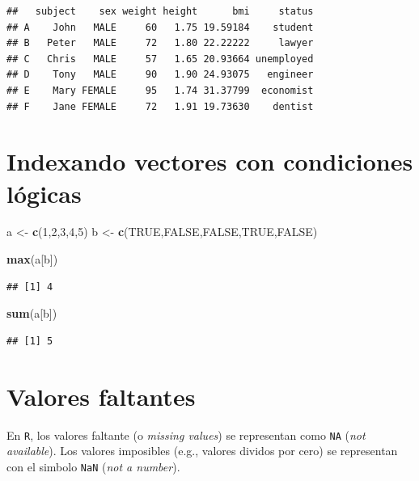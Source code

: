 \documentclass[]{book}
\newenvironment{Shaded}{\begin{snugshade}}{\end{snugshade}}
\newcommand{\KeywordTok}[1]{\textcolor[rgb]{0.13,0.29,0.53}{\textbf{#1}}}
\newcommand{\DecValTok}[1]{\textcolor[rgb]{0.00,0.00,0.81}{#1}}
\newcommand{\StringTok}[1]{\textcolor[rgb]{0.31,0.60,0.02}{#1}}
\newcommand{\OtherTok}[1]{\textcolor[rgb]{0.56,0.35,0.01}{#1}}
\newcommand{\NormalTok}[1]{#1}
\begin{document}
\begin{verbatim}
##   subject    sex weight height      bmi     status
## A    John   MALE     60   1.75 19.59184    student
## B   Peter   MALE     72   1.80 22.22222     lawyer
## C   Chris   MALE     57   1.65 20.93664 unemployed
## D    Tony   MALE     90   1.90 24.93075   engineer
## E    Mary FEMALE     95   1.74 31.37799  economist
## F    Jane FEMALE     72   1.91 19.73630    dentist
\end{verbatim}

\section{Indexando vectores con condiciones
lógicas}\label{indexando-vectores-con-condiciones-luxf3gicas}

\begin{Shaded}
\begin{Highlighting}[]
\NormalTok{a <-}\StringTok{ }\KeywordTok{c}\NormalTok{(}\DecValTok{1}\NormalTok{,}\DecValTok{2}\NormalTok{,}\DecValTok{3}\NormalTok{,}\DecValTok{4}\NormalTok{,}\DecValTok{5}\NormalTok{)}
\NormalTok{b <-}\StringTok{ }\KeywordTok{c}\NormalTok{(}\OtherTok{TRUE}\NormalTok{,}\OtherTok{FALSE}\NormalTok{,}\OtherTok{FALSE}\NormalTok{,}\OtherTok{TRUE}\NormalTok{,}\OtherTok{FALSE}\NormalTok{)}

\KeywordTok{max}\NormalTok{(a[b])}
\end{Highlighting}
\end{Shaded}

\begin{verbatim}
## [1] 4
\end{verbatim}

\begin{Shaded}
\begin{Highlighting}[]
\KeywordTok{sum}\NormalTok{(a[b])}
\end{Highlighting}
\end{Shaded}

\begin{verbatim}
## [1] 5
\end{verbatim}

\section{Valores faltantes}\label{valores-faltantes}

En \texttt{R}, los valores faltante (o \emph{missing values}) se
representan como \texttt{NA} (\emph{not available}). Los valores
imposibles (e.g., valores dividos por cero) se representan con el
simbolo \texttt{NaN} (\emph{not a number}).
\end{document}
